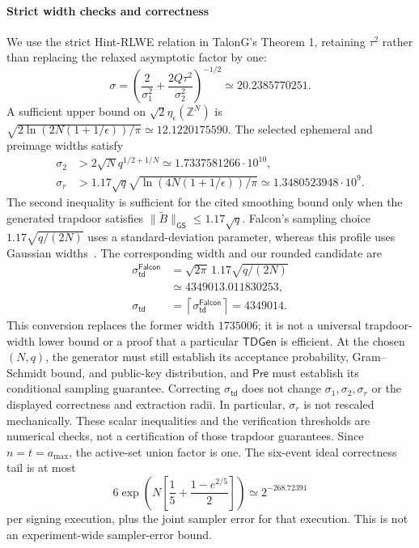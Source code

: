 \documentclass[lettersize,journal]{IEEEtran}
\begin{document}
\paragraph{Strict width checks and correctness}
We use the strict Hint-RLWE relation in TalonG's Theorem 1, retaining
$\tau^2$ rather than replacing the relaxed asymptotic factor by one:
\[
\sigma=\left(\frac{2}{\sigma_1^2}
               +\frac{2Q\tau^2}{\sigma_2^2}\right)^{-1/2}
\simeq20.2385770251.
\]
A sufficient upper bound on $\sqrt2\eta_\epsilon(\mathbb Z^N)$ is
$\sqrt{2\ln(2N(1+1/\epsilon))/\pi}\simeq12.1220175590$.
The selected ephemeral and preimage widths satisfy
\[
\begin{aligned}
\sigma_2&>2\sqrt N q^{1/2+1/N}
                 \simeq1.7337581266\cdot10^{10},\\
\sigma_r&>1.17\sqrt q\sqrt{\ln(4N(1+1/\epsilon))/\pi}
                 \simeq1.3480523948\cdot10^9.
\end{aligned}
\]
The second inequality is sufficient for the cited smoothing
bound only when the generated trapdoor satisfies
$\|\widetilde B\|_{\mathsf{GS}}\leq1.17\sqrt q$.
Falcon's sampling choice $1.17\sqrt{q/(2N)}$ uses a standard-deviation
parameter, whereas this profile uses Gaussian widths~\cite{FalconSpecV12}.
The corresponding width and our rounded candidate are
\[
\begin{aligned}
\sigma_{\mathsf{td}}^{\mathsf{Falcon}}
&=\sqrt{2\pi}\,1.17\sqrt{q/(2N)}\\
&\simeq4349013.011830253,\\
\sigma_{\mathsf{td}}
&=\left\lceil\sigma_{\mathsf{td}}^{\mathsf{Falcon}}\right\rceil
=4349014.
\end{aligned}
\]
This conversion replaces the former width $1735006$; it is not a
universal trapdoor-width lower bound or a proof that a particular
$\mathsf{TDGen}$ is efficient. At the chosen $(N,q)$, the generator must
still establish its acceptance probability, Gram--Schmidt bound, and
public-key distribution, and $\mathsf{Pre}$ must establish its conditional
sampling guarantee. Correcting $\sigma_{\mathsf{td}}$ does not change
$\sigma_1,\sigma_2,\sigma_r$ or the displayed correctness and extraction
radii. In particular, $\sigma_r$ is not rescaled mechanically.
These scalar inequalities and the verification thresholds are numerical
checks, not a certification of those trapdoor guarantees.
Since $n=t=a_{\max}$, the active-set union factor is one.
The six-event ideal correctness tail is at most
\[
6\exp\!\left(N\left[\frac15+
                 \frac{1-e^{2/5}}2\right]\right)
\simeq2^{-268.72391}
\]
per signing execution, plus the joint sampler error for that execution.
This is not an experiment-wide sampler-error bound.
\end{document}
